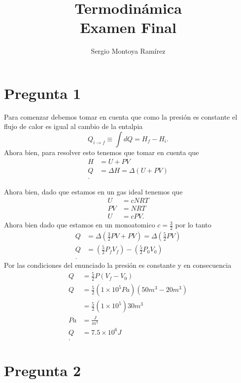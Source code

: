 \documentclass{report}
\title{\Huge{Termodinámica}\\Examen Final}
\author{\huge{Sergio Montoya Ramírez}}
\date{}
\begin{document}
\maketitle
\newpage%
\tableofcontents
\pagebreak

\chapter{Pregunta 1}

Para comenzar debemos tomar en cuenta que como la presión es constante el flujo de calor es igual al cambio de la entalpia \[
Q_{i\to f}\equiv \int dQ = H_f-H_i
.\] Ahora bien, para resolver esto tenemos que tomar en cuenta que
\begin{align*}
  H &= U + PV \\
  Q &= \Delta H = \Delta(U + PV) \\
.\end{align*}

Ahora bien, dado que estamos en un gas ideal tenemos que
\begin{align*}
  U &= cNRT \\
  PV &= NRT \\
  U &= cPV 
.\end{align*}
Ahora bien dado que estamos en un monoatomico $c = \frac{3}{2}$ por lo tanto
\begin{align*}
  Q &= \Delta \left( \frac{3}{2}PV + PV \right) = \Delta\left( \frac{5}{2}PV \right) \\
  Q &= \left( \frac{5}{2}P_fV_f \right) - \left( \frac{5}{2}P_0V_0 \right)  \\
.\end{align*}
Por las condiciones del enunciado la presión es constante y en consecuencia
\begin{align*}
  Q &= \frac{5}{2}P\left( V_f - V_0 \right)  \\
  Q &= \frac{5}{2}\left( 1\times 10^{5}Pa \right) \left( 50 m^{3}-20 m^{3}\right) \\
  &= \frac{5}{2}\left( 1\times 10^5 \right) 30m^{3} \\
  Pa &= \frac{J}{m^{3}} \\
  Q &= 7.5\times 10^{6} J \\
.\end{align*}
\chapter{Pregunta 2}
\end{document}
